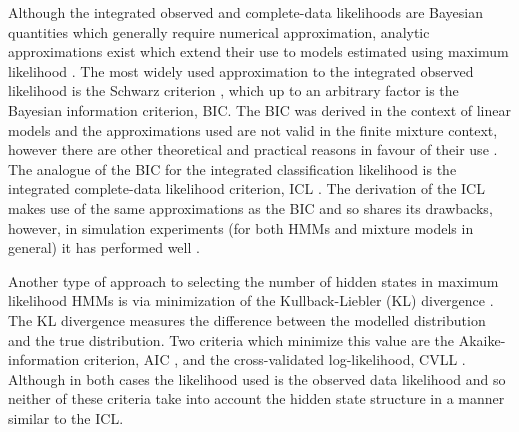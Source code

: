 Although the integrated observed and complete-data likelihoods are Bayesian quantities which generally require numerical approximation, analytic approximations exist which extend their use to models estimated using maximum likelihood \cite{kassBayesFactors1995, mclachlanFiniteMixtureModels2000}. The most widely used approximation to the integrated observed likelihood is the Schwarz criterion \cite{schwarzEstimatingDimensionModel1978a}, which up to an arbitrary factor is the Bayesian information criterion, BIC. The BIC was derived in the context of linear models and the approximations used are not valid in the finite mixture context, however there are other theoretical and practical reasons in favour of their use \cite{fraley1998many}. The analogue of the BIC for the integrated classification likelihood is the integrated complete-data likelihood criterion, ICL \cite{biernackiAssessingMixtureModel2000a}.  The derivation of the ICL makes use of the same approximations as the BIC and so shares its drawbacks, however, in simulation experiments (for both HMMs and mixture models in general) it has performed well \cite{mclachlanFiniteMixtureModels2000,celeuxSelectingHiddenMarkov2008, biernackiAssessingMixtureModel2000a}.

Another type of approach to selecting the number of hidden states in maximum likelihood HMMs is via minimization of the Kullback-Liebler (KL) divergence \cite{kullbackInformationSufficiency1951}. The KL divergence  measures the difference between the modelled distribution and the true distribution. Two criteria which minimize this value are the Akaike-information criterion, AIC \cite{akaikeInformationTheoryExtension1998}, and the cross-validated log-likelihood, CVLL \cite{celeuxSelectingHiddenMarkov2008}. Although in both cases the likelihood used is the observed data likelihood and so neither of these criteria take into account the hidden state structure in a manner similar to the ICL. 

